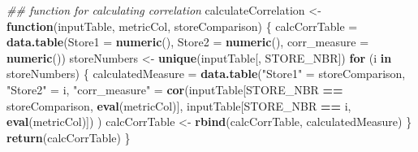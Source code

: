 \documentclass[
]{article}
\newenvironment{Shaded}{\begin{snugshade}}{\end{snugshade}}
\newcommand{\CommentTok}[1]{\textcolor[rgb]{0.56,0.35,0.01}{\textit{#1}}}
\newcommand{\ControlFlowTok}[1]{\textcolor[rgb]{0.13,0.29,0.53}{\textbf{#1}}}
\newcommand{\DataTypeTok}[1]{\textcolor[rgb]{0.13,0.29,0.53}{#1}}
\newcommand{\KeywordTok}[1]{\textcolor[rgb]{0.13,0.29,0.53}{\textbf{#1}}}
\newcommand{\NormalTok}[1]{#1}
\newcommand{\OperatorTok}[1]{\textcolor[rgb]{0.81,0.36,0.00}{\textbf{#1}}}
\newcommand{\StringTok}[1]{\textcolor[rgb]{0.31,0.60,0.02}{#1}}
\begin{document}
\begin{Shaded}
\begin{Highlighting}[]
{{{\CommentTok{## function for calculating correlation}
\NormalTok{calculateCorrelation <-}\StringTok{ }\ControlFlowTok{function}\NormalTok{(inputTable, metricCol, storeComparison) \{}
\NormalTok{calcCorrTable =}\StringTok{ }\KeywordTok{data.table}\NormalTok{(}\DataTypeTok{Store1 =} \KeywordTok{numeric}\NormalTok{(), }\DataTypeTok{Store2 =} \KeywordTok{numeric}\NormalTok{(), }\DataTypeTok{corr_measure =}
\KeywordTok{numeric}\NormalTok{())}
\NormalTok{storeNumbers <-}\StringTok{ }\KeywordTok{unique}\NormalTok{(inputTable[, STORE_NBR])}
\ControlFlowTok{for}\NormalTok{ (i }\ControlFlowTok{in}\NormalTok{ storeNumbers) \{}
\NormalTok{calculatedMeasure =}\StringTok{ }\KeywordTok{data.table}\NormalTok{(}\StringTok{"Store1"}\NormalTok{ =}\StringTok{ }\NormalTok{storeComparison,}
\StringTok{"Store2"}\NormalTok{ =}\StringTok{ }\NormalTok{i,}
\StringTok{"corr_measure"}\NormalTok{ =}\StringTok{ }\KeywordTok{cor}\NormalTok{(inputTable[STORE_NBR }\OperatorTok{==}\StringTok{ }\NormalTok{storeComparison, }\KeywordTok{eval}\NormalTok{(metricCol)], inputTable[STORE_NBR }\OperatorTok{==}\StringTok{ }\NormalTok{i, }\KeywordTok{eval}\NormalTok{(metricCol)])}
\NormalTok{)}
\NormalTok{calcCorrTable <-}\StringTok{ }\KeywordTok{rbind}\NormalTok{(calcCorrTable, calculatedMeasure)}
\NormalTok{\}}
\KeywordTok{return}\NormalTok{(calcCorrTable)}
\NormalTok{\}}

}}}
\end{Highlighting}
\end{Shaded}
\end{document}
